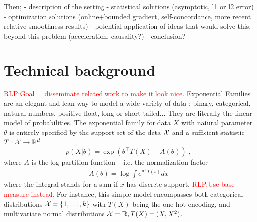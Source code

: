 \documentclass[twoside]{article}
\newcommand{\RLP}[1]{\textcolor{red}{RLP:#1}}
\newcommand{\logpart}{A}
\newcommand{\natp}{\theta}
\begin{document}
Then; 
- description of the setting
- statistical solutions (asymptotic, l1 or l2 error)
- optimization solutions (online+bounded gradient, self-concordance, more recent relative smoothness results)
- potential application of ideas that would solve this, beyond this problem (acceleration, causality?)
- conclusion?









\section{Technical background}

\RLP{Goal = disseminate related work to make it look nice.}
Exponential Families are an elegant and lean way to model a wide variety of data : binary, categorical, natural numbers, positive float, long or short tailed... 
They are literally the linear model of probabilities.
The exponential family for data $X$ with natural parameter $\natp$  is entirely specified by the support set of the data   ${\mathcal X}$ and a sufficient statistic $T: {\mathcal X} \rightarrow \mathbb{R}^d$
\begin{equation}
	 p(X|\natp) = \exp( \natp^\top T(X) - \logpart(\natp)) \; ,
\end{equation}
where $\logpart$ is the log-partition function -- i.e. the normalization factor
\begin{align}
    \logpart(\natp) = \log \int e^{\natp^\top T(x)} dx 
\end{align}
where the integral stands for a sum if $x$ has discrete support. \RLP{Use base measure instead.}
For instance, this simple model encompasses both categorical distributions ${\mathcal X} = \{1, \dots, k\}$ with $T(X)$ being the one-hot encoding, and multivariate normal distributions ${\mathcal X}=\mathbb{R}, T(X)=(X, X^2)$. 
\end{document}
